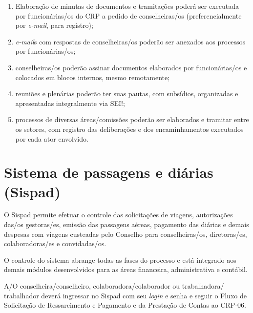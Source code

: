\documentclass[openright, twoside, a4paper]{memoir}
\begin{document}
\begin{enumerate}
\def\labelenumi{\roman{enumi}.}
\item
    Elaboração de minutas de documentos e tramitações poderá ser executada
    por funcionárias/os do CRP a pedido de conselheiras/os
    (preferencialmente por \emph{e-mail}, para registro);
\item
    \emph{e-mail}s com respostas de conselheiras/os poderão ser anexados
    aos processos por funcionárias/os;
\item
    conselheiras/os poderão assinar documentos elaborados por
    funcionárias/os e colocados em blocos internos, mesmo remotamente;
\item
    reuniões e plenárias poderão ter suas pautas, com subsídios,
    organizadas e apresentadas integralmente via SEI!;
\item
    processos de diversas áreas/comissões poderão ser elaborados e
    tramitar entre os setores, com registro das deliberações e dos
    encaminhamentos executados por cada ator envolvido.
\end{enumerate}

\section{Sistema de passagens e diárias
(Sispad)}

O Sispad permite efetuar o controle das solicitações de viagens,
autorizações das/os gestoras/es, emissão das passagens aéreas, pagamento
das diárias e demais despesas com viagens custeadas pelo Conselho para
conselheiras/os, diretoras/es, colaboradoras/es e convidadas/os.

O controle do sistema abrange todas as fases do processo e está
integrado aos demais módulos desenvolvidos para as áreas financeira,
administrativa e contábil.

A/O conselheira/conselheiro, colaboradora/colaborador ou
trabalhadora/‌trabalhador deverá ingressar no Sispad com seu \emph{login}
e senha e seguir o Fluxo de Solicitação de Ressarcimento e Pagamento e
da Prestação de Contas ao CRP-06.
\end{document}
